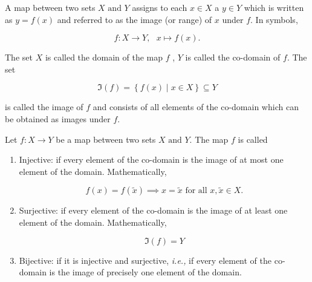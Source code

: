\documentclass[a4paper,12pt]{report}
\begin{document}
\begin{definition}
A map between two sets \(X \text { and } Y\) assigns to each \(x \in  X \) a \(y \in Y\) which is written as \(y=f(x)\) and referred to as the image (or range) of \(x\) under \(f\). In symbols, 

\begin{equation}
    f:X \rightarrow Y,~~~  x \mapsto f(x).
\end{equation}

The set \(X\) is called the domain of the map \(f\) , \(Y\) is called the co-domain of \(f\). The set 

\begin{equation}
    \Im (f) = \left\{ f(x) \mid x \in  X \right\} \subseteq Y
\end{equation}

is called the image of \(f\) and consists of all elements of the co-domain which can be obtained as images under \(f\). 


\end{definition}

\begin{definition}
Let \(f:X \rightarrow Y\) be a map between two sets \(X \text { and } Y\). The map \(f\) is called

\begin{enumerate}
    \item Injective: if every element of the co-domain is the image of at most one element of the domain. Mathematically,
    
    \begin{equation}
        f(x) = f(\tilde{x} ) \implies x = \tilde{x} \text{ for all } x,\tilde{x} \in X.
    \end{equation}

    \item Surjective: if every element of the co-domain is the image of at least one element of the domain. Mathematically,
    
    \begin{equation}
        \Im (f) = Y
    \end{equation}
    
    \item Bijective: if it is injective and surjective, \textit{i.e.,} if every element of the co-domain is the image of precisely one element of the domain.
   
\end{enumerate}

\end{definition}
\end{document}
